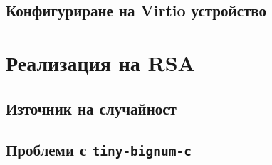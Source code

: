   \subsection{Конфигуриране на Virtio устройство}

\section{Реализация на RSA}
  \subsection{Източник на случайност}

  \subsection{Проблеми с {\tt tiny-bignum-c}}

